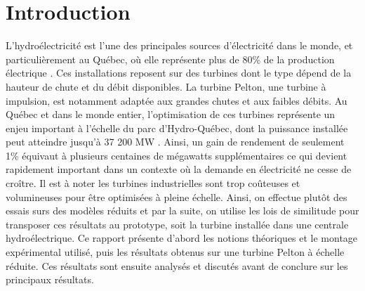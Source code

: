 \section{Introduction}
L’hydroélectricité est l’une des principales sources d’électricité dans le monde, et particulièrement au Québec, où elle représente plus de 80\% de la production électrique \cite{hydroquebec_hydroelectricite}. 
Ces installations reposent sur des turbines dont le type dépend de la hauteur de chute et du débit disponibles. 
La turbine Pelton, une turbine à impulsion, est notamment adaptée aux grandes chutes et aux faibles débits. 
Au Québec et dans le monde entier, l'optimisation de ces turbines représente un enjeu important à l'échelle du parc d'Hydro-Québec, dont la puissance installée peut atteindre jusqu'à 37 200 MW \cite{hydroquebec_hydroelectricite}.
Ainsi, un gain de rendement de seulement 1\% équivaut à plusieurs centaines de mégawatts supplémentaires ce qui devient rapidement important dans un contexte où la demande en électricité ne cesse de croître.
Il est à noter les turbines industrielles sont trop coûteuses et volumineuses pour être optimisées à pleine échelle.
Ainsi, on effectue plutôt des essais surs des modèles réduits et par la suite, on utilise les lois de similitude pour transposer ces résultats au prototype, soit la turbine installée dans une centrale hydroélectrique.
Ce rapport présente d’abord les notions théoriques et le montage expérimental utilisé, puis les résultats obtenus sur une turbine Pelton à échelle réduite.
Ces résultats sont ensuite analysés et discutés avant de conclure sur les principaux résultats.
